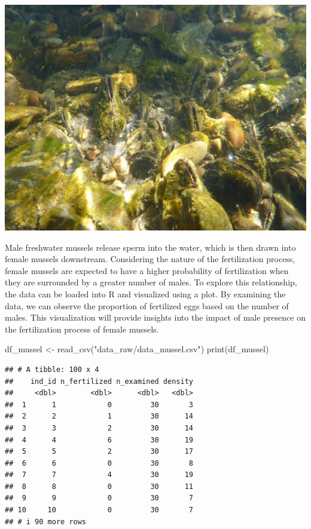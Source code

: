 \documentclass[
]{article}
\newenvironment{Shaded}{\begin{snugshade}}{\end{snugshade}}
\newcommand{\FunctionTok}[1]{\textcolor[rgb]{0.00,0.00,0.00}{#1}}
\newcommand{\NormalTok}[1]{#1}
\newcommand{\OtherTok}[1]{\textcolor[rgb]{0.56,0.35,0.01}{#1}}
\newcommand{\StringTok}[1]{\textcolor[rgb]{0.31,0.60,0.02}{#1}}
\begin{document}
\begin{center}\includegraphics[width=8.33in]{image/image_mussel} \end{center}

Male freshwater mussels release sperm into the water, which is then drawn into female mussels downstream. Considering the nature of the fertilization process, female mussels are expected to have a higher probability of fertilization when they are surrounded by a greater number of males. To explore this relationship, the data can be loaded into R and visualized using a plot. By examining the data, we can observe the proportion of fertilized eggs based on the number of males. This visualization will provide insights into the impact of male presence on the fertilization process of female mussels.

\begin{Shaded}
\begin{Highlighting}[]
\NormalTok{df\_mussel }\OtherTok{\textless{}{-}} \FunctionTok{read\_csv}\NormalTok{(}\StringTok{"data\_raw/data\_mussel.csv"}\NormalTok{)}
\FunctionTok{print}\NormalTok{(df\_mussel)}
\end{Highlighting}
\end{Shaded}

\begin{verbatim}
## # A tibble: 100 x 4
##    ind_id n_fertilized n_examined density
##     <dbl>        <dbl>      <dbl>   <dbl>
##  1      1            0         30       3
##  2      2            1         30      14
##  3      3            2         30      14
##  4      4            6         30      19
##  5      5            2         30      17
##  6      6            0         30       8
##  7      7            4         30      19
##  8      8            0         30      11
##  9      9            0         30       7
## 10     10            0         30       7
## # i 90 more rows
\end{verbatim}
\end{document}
